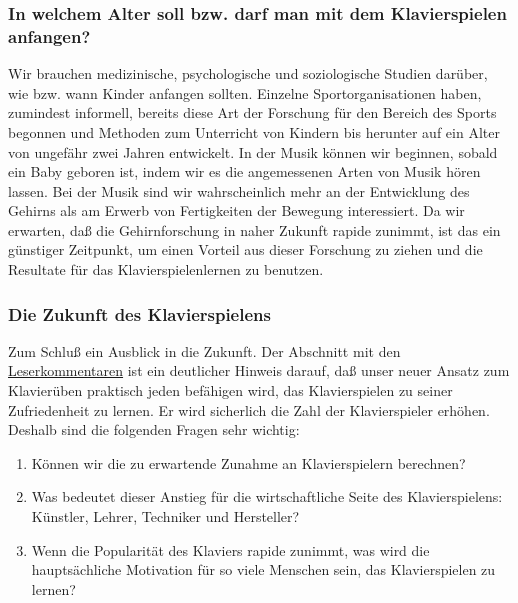 \subsubsection{In welchem Alter soll bzw. darf man mit dem Klavierspielen anfangen?}
\label{c1iv6g}

Wir brauchen medizinische, psychologische und soziologische Studien darüber, wie bzw. wann Kinder anfangen sollten.
Einzelne Sportorganisationen haben, zumindest informell, bereits diese Art der Forschung für den Bereich des Sports begonnen und Methoden zum Unterricht von Kindern bis herunter auf ein Alter von ungefähr zwei Jahren entwickelt.
In der Musik können wir beginnen, sobald ein Baby geboren ist, indem wir es die angemessenen Arten von Musik hören lassen.
Bei der Musik sind wir wahrscheinlich mehr an der Entwicklung des Gehirns als am Erwerb von Fertigkeiten der Bewegung interessiert.
Da wir erwarten, daß die Gehirnforschung in naher Zukunft rapide zunimmt, ist das ein günstiger Zeitpunkt, um einen Vorteil aus dieser Forschung zu ziehen und die Resultate für das Klavierspielenlernen zu benutzen.


\subsubsection{Die Zukunft des Klavierspielens}
\label{c1iv6h}

Zum Schluß ein Ausblick in die Zukunft.
Der Abschnitt mit den \hyperref[testimonials]{Leserkommentaren} ist ein deutlicher Hinweis darauf, daß unser neuer Ansatz zum Klavierüben praktisch jeden befähigen wird, das Klavierspielen zu seiner Zufriedenheit zu lernen.
Er wird sicherlich die Zahl der Klavierspieler erhöhen.
Deshalb sind die folgenden Fragen sehr wichtig:

\begin{enumerate} 
 \item Können wir die zu erwartende Zunahme an Klavierspielern berechnen?
 \item Was bedeutet dieser Anstieg für die wirtschaftliche Seite des Klavierspielens: Künstler, Lehrer, Techniker und Hersteller?
 \item Wenn die Popularität des Klaviers rapide zunimmt, was wird die hauptsächliche Motivation für so viele Menschen sein, das Klavierspielen zu lernen?
\end{enumerate}

